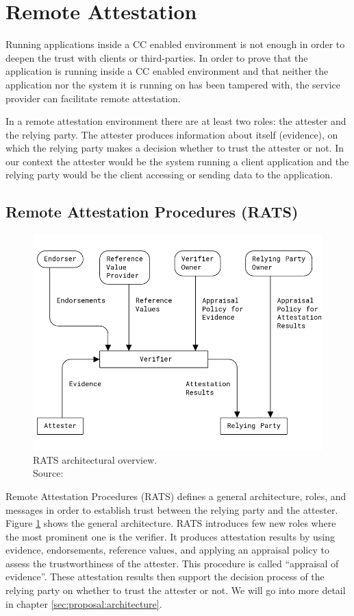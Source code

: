 \section{Remote Attestation}
\label{ch:remote-attestation}

Running applications inside a CC enabled environment is not enough in order to
deepen the trust with clients or third-parties. In order to prove that the
application is running inside a CC enabled environment and that neither the
application nor the system it is running on has been tampered with, the service
provider can facilitate remote attestation.

In a remote attestation environment there are at least two roles: the attester
and the relying party. The attester produces information about itself
(evidence), on which the relying party makes a decision whether to trust the
attester or not. In our context the attester would be the system running a
client application and the relying party would be the client accessing or
sending data to the application.

\subsection{Remote Attestation Procedures (RATS)}
\label{sec:rats}

\begin{figure}
  \centering
  \includegraphics[width=0.7\linewidth]{resources/rats-architecture.png}
  \caption[RATS architectural overview]{
    RATS architectural overview.\\
    Source:  \cite{rfc9334}
  }
  \label{figure:rats-architecture}
\end{figure}

Remote Attestation Procedures (RATS) defines a general architecture, roles, and
messages in order to establish trust between the relying party and the attester.
Figure \ref{figure:rats-architecture} shows the general architecture. RATS
introduces few new roles where the most prominent one is the verifier. It
produces attestation results by using evidence, endorsements, reference values,
and applying an appraisal policy to assess the trustworthiness of the attester.
This procedure is called ``appraisal of evidence''. These attestation results
then support the decision process of the relying party on whether to trust the
attester or not. We will go into more detail in chapter
\ref{sec:proposal:architecture}.
